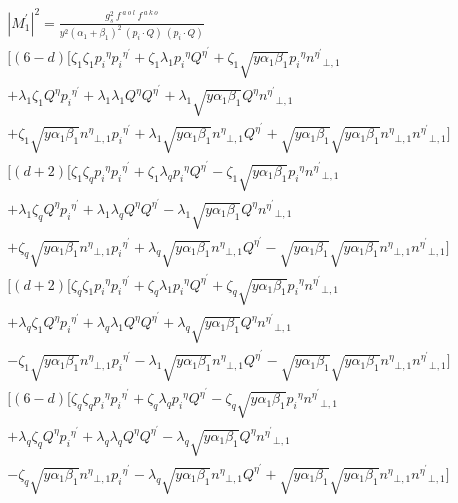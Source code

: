 \begin{equation}
\begin{split}
{|{M}^{\prime}_1|}^2 =\frac{g_s^2 \:f^{\:a\:o\:l}\: f^{\:a\:k\:o}}{y^2({\alpha_1}+\beta_1)^2\:(p_i\cdot Q) \:(p_i\cdot Q)} \\
[(6-d)[\zeta_1 \zeta_1 {p_i}^{\eta}{p_i}^{{\eta}^{\prime}}+\zeta_1 \lambda_1{p_i}^{\eta}{Q}^{{\eta}^{\prime}}+\zeta_1\sqrt{y\alpha_1\beta_1}{p_i}^{\eta}{n^{{\eta}^{\prime}}}_{\bot,1}\\
+\lambda_1\zeta_1 {Q}^{\eta}{p_i}^{{\eta}^{\prime}}+\lambda_1\lambda_1{Q}^{\eta}{Q}^{{\eta}^{\prime}}+\lambda_1\sqrt{y\alpha_1\beta_1}{Q}^{\eta}{n^{{\eta}^{\prime}}}_{\bot,1}\\
+\zeta_1\sqrt{y\alpha_1\beta_1} {n^{{\eta}}}_{\bot,1}{p_i}^{{\eta}^{\prime}}+\lambda_1\sqrt{y\alpha_1\beta_1}{n^{{\eta}}}_{\bot,1}{Q}^{{\eta}^{\prime}}+\sqrt{y\alpha_1\beta_1}\sqrt{y\alpha_1\beta_1}{n^{{\eta}}}_{\bot,1}{n^{{\eta}^{\prime}}}_{\bot,1}]\\
[(d+2)[\zeta_1 \zeta_q {p_i}^{\eta}{p_i}^{{\eta}^{\prime}}+\zeta_1 \lambda_q{p_i}^{\eta}{Q}^{{\eta}^{\prime}}-\zeta_1\sqrt{y\alpha_1\beta_1}{p_i}^{\eta}{n^{{\eta}^{\prime}}}_{\bot,1}\\
+\lambda_1\zeta_q {Q}^{\eta}{p_i}^{{\eta}^{\prime}}+\lambda_1\lambda_q{Q}^{\eta}{Q}^{{\eta}^{\prime}}-\lambda_1\sqrt{y\alpha_1\beta_1}{Q}^{\eta}{n^{{\eta}^{\prime}}}_{\bot,1}\\
+\zeta_q\sqrt{y\alpha_1\beta_1} {n^{{\eta}}}_{\bot,1}{p_i}^{{\eta}^{\prime}}+\lambda_q\sqrt{y\alpha_1\beta_1}{n^{{\eta}}}_{\bot,1}{Q}^{{\eta}^{\prime}}-\sqrt{y\alpha_1\beta_1}\sqrt{y\alpha_1\beta_1}{n^{{\eta}}}_{\bot,1}{n^{{\eta}^{\prime}}}_{\bot,1}]\\
[(d+2)[\zeta_q \zeta_1 {p_i}^{\eta}{p_i}^{{\eta}^{\prime}}+\zeta_q \lambda_1{p_i}^{\eta}{Q}^{{\eta}^{\prime}}+\zeta_q\sqrt{y\alpha_1\beta_1}{p_i}^{\eta}{n^{{\eta}^{\prime}}}_{\bot,1}\\
+\lambda_q\zeta_1 {Q}^{\eta}{p_i}^{{\eta}^{\prime}}+\lambda_q\lambda_1{Q}^{\eta}{Q}^{{\eta}^{\prime}}+\lambda_q\sqrt{y\alpha_1\beta_1}{Q}^{\eta}{n^{{\eta}^{\prime}}}_{\bot,1}\\
-\zeta_1\sqrt{y\alpha_1\beta_1} {n^{{\eta}}}_{\bot,1}{p_i}^{{\eta}^{\prime}}-\lambda_1\sqrt{y\alpha_1\beta_1}{n^{{\eta}}}_{\bot,1}{Q}^{{\eta}^{\prime}}-\sqrt{y\alpha_1\beta_1}\sqrt{y\alpha_1\beta_1}{n^{{\eta}}}_{\bot,1}{n^{{\eta}^{\prime}}}_{\bot,1}]\\
[(6-d)[\zeta_q \zeta_q {p_i}^{\eta}{p_i}^{{\eta}^{\prime}}+\zeta_q \lambda_q{p_i}^{\eta}{Q}^{{\eta}^{\prime}}-\zeta_q\sqrt{y\alpha_1\beta_1}{p_i}^{\eta}{n^{{\eta}^{\prime}}}_{\bot,1}\\
+\lambda_q\zeta_q {Q}^{\eta}{p_i}^{{\eta}^{\prime}}+\lambda_q\lambda_q{Q}^{\eta}{Q}^{{\eta}^{\prime}}-\lambda_q\sqrt{y\alpha_1\beta_1}{Q}^{\eta}{n^{{\eta}^{\prime}}}_{\bot,1}\\
-\zeta_q\sqrt{y\alpha_1\beta_1} {n^{{\eta}}}_{\bot,1}{p_i}^{{\eta}^{\prime}}-\lambda_q\sqrt{y\alpha_1\beta_1}{n^{{\eta}}}_{\bot,1}{Q}^{{\eta}^{\prime}}+\sqrt{y\alpha_1\beta_1}\sqrt{y\alpha_1\beta_1}{n^{{\eta}}}_{\bot,1}{n^{{\eta}^{\prime}}}_{\bot,1}]\\
\end{split}
\end{equation}
